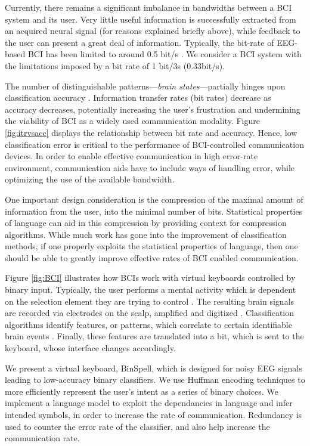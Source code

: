 \documentclass[12pt,titlepage]{article}
\begin{document}
Currently, there remains a significant imbalance in bandwidths between a BCI system and its 
user. Very little useful information is successfully extracted from an acquired neural signal (for 
reasons explained briefly above), while feedback to the user can present a great deal of 
information.  Typically, the bit-rate of EEG-based BCI has been limited to around 0.5 bit/s \cite{millan2004}.  We consider a BCI system with the limitations imposed by a bit rate of 1 bit/3s (0.33bit/s).

The number of distinguishable patterns---\emph{brain states}---partially hinges upon classification 
accuracy \cite{lotte_review_2007}.  Information transfer rates (bit rates) decrease as accuracy decreases, potentially increasing the user's frustration and  undermining the viability of BCI as a widely used communication modality.  Figure \ref{fig:itrvsacc} displays the relationship between bit rate and accuracy.  Hence, low classification error is critical to the performance of BCI-controlled communication devices.  In order to enable effective communication in high error-rate environment, communication aids have to include ways of handling error, while optimizing the use of the available bandwidth.

One important design consideration is the compression of the maximal amount of information 
from the user, into the minimal number of bits.  Statistical properties of language can aid in this 
compression by providing context for compression algorithms.  While much work has gone 
into the improvement of classification methods, if one properly exploits the statistical 
properties of language, then one should be able to greatly improve effective rates of BCI 
enabled communication. 

Figure \ref{fig:BCI} illustrates how BCIs work with virtual keyboards controlled by binary input.  Typically, the user performs a mental activity which is dependent on the selection element they are trying to control \cite{molina_direct}.  The resulting brain signals are recorded via electrodes on the scalp, amplified and digitized \cite{lotte_review_2007}.  Classification algorithms identify features, or patterns, which correlate to certain identifiable brain events \cite{lotte_review_2007}.  Finally, these features are translated into a bit, which is sent to the keyboard, whose interface changes accordingly.

We present a virtual keyboard, BinSpell, which is designed for noisy EEG signals leading to low-accuracy binary classifiers.  We use Huffman encoding techniques to more efficiently represent the user's intent as a series of binary choices.  We implement a language model to exploit the dependancies in language and infer intended symbols, in order to increase the rate of communication. Redundancy is used to counter the error rate of the classifier, and also help increase the communication rate.
\end{document}

